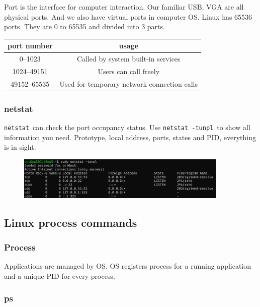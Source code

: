 \documentclass[12pt]{ctexart}
\begin{document}
Port is the interface for computer interaction. Our familiar USB, VGA
are all physical ports. And we also have virtual ports in computer OS.
Linux has 65536 ports. They are 0 to 65535 and divided into 3 parts.

\begin{table}[H]
    \centering
    \begin{tabular}{cc}
    \toprule
    port number & usage \\
    \midrule
    0--1023 & Called by system built-in services \\
    1024--49151 & Users can call freely \\
    49152--65535 & Used for temporary network connection calls \\
    \bottomrule
    \end{tabular}
\end{table}

\subsubsection*{\textbf{netstat}}

\texttt{netstat}\ can check the port occupancy status. Use
\texttt{netstat\ -tunpl}\ to show all information you need. Prototype,
local address, ports, states and PID, everything is in sight.

\begin{figure}[H]
    \centering
    \includegraphics[width=0.9\textwidth,keepaspectratio]{assets/Linux/1.9 Linux network commands/5.png}
\end{figure}

\subsection{\textbf{Linux process commands}}

\subsubsection{\textbf{Process}}

Applications are managed by OS. OS registers process for a running
application and a unique PID for every process.

\subsubsection{\textbf{ps}}
\end{document}
